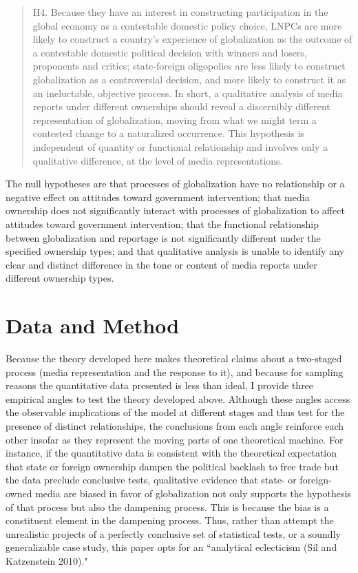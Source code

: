 \documentclass[12pt]{report}
\begin{document}
\singlespacing
\begin{quote}
H4. Because they have an interest in constructing participation in the global economy as a contestable domestic policy choice, LNPCs are more likely to construct a country's experience of globalization as the outcome of a contestable domestic political decision with winners and losers, proponents and critics; state-foreign oligopolies are less likely to construct globalization as a controversial decision, and more likely to construct it as an ineluctable, objective process. In short, a qualitative analysis of media reports under different ownerships should reveal a discernibly different representation of globalization, moving from what we might term a contested change to a naturalized occurrence. This hypothesis is independent of quantity or functional relationship and involves only a qualitative difference, at the level of media representations.
\end{quote}
\doublespacing

The null hypotheses are that processes of globalization have no relationship or a negative effect on attitudes toward government intervention; that media ownership does not significantly interact with processes of globalization to affect attitudes toward government intervention; that the functional relationship between globalization and reportage is not significantly different under the specified ownership types; and that qualitative analysis is unable to identify any clear and distinct difference in the tone or content of media reports under different ownership types.

\section{Data and Method}

Because the theory developed here makes theoretical claims about a two-staged process (media representation and the response to it), and because for sampling reasons the quantitative data presented is less than ideal, I provide three empirical angles to test the theory developed above. Although these angles access the observable implications of the model at different stages and thus test for the presence of distinct relationships, the conclusions from each angle reinforce each other insofar as they represent the moving parts of one theoretical machine. For instance, if the quantitative data is consistent with the theoretical expectation that state or foreign ownership dampen the political backlash to free trade but the data preclude conclusive tests, qualitative evidence that state- or foreign-owned media are biased in favor of globalization not only supports the hypothesis of that process but also the dampening process. This is because the bias is a constituent element in the dampening process. Thus, rather than attempt the unrealistic projects of a perfectly conclusive set of statistical tests, or a soundly generalizable case study, this paper opts for an ``analytical eclecticism (Sil and Katzenstein 2010)."
\end{document}
